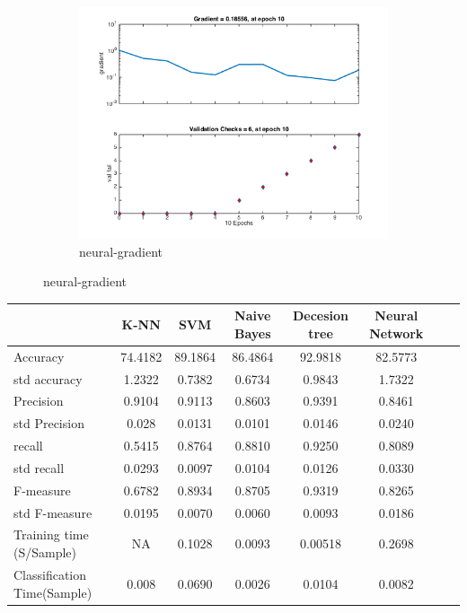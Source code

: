 \documentclass[]{article}
\begin{document}
\begin{figure}[p]
	\begin{subfigure}{.5\textwidth}
		\centering
		\includegraphics[width=1\linewidth]{../images-update/1-(4)-neural_gradient.png}
		\caption{neural-gradient}
		\label{fig:sub1}
	\end{subfigure}
	
\end{figure}
\begin{tabular}
	{l*{6}{c}r}   	& K-NN  & SVM & Naive Bayes & Decesion tree & Neural Network \\ \hline
	Accuracy & 74.4182 & 89.1864 & 86.4864 & 92.9818 & 82.5773 \\ 
	std accuracy & 1.2322 & 0.7382 & 0.6734 & 0.9843 & 1.7322 \\
	Precision & 0.9104 & 0.9113 & 0.8603 &0.9391 & 0.8461\\
	std Precision & 0.028 & 0.0131 & 0.0101 & 0.0146 & 0.0240\\
	recall & 0.5415 & 0.8764 & 0.8810 & 0.9250 & 0.8089\\
	std recall & 0.0293 & 0.0097 & 0.0104 & 0.0126 & 0.0330\\
	F-measure & 0.6782 & 0.8934 & 0.8705 & 0.9319 & 0.8265 \\
	std F-measure & 0.0195 & 0.0070 & 0.0060 & 0.0093 & 0.0186 \\
	Training time (S/Sample) & NA & 0.1028 & 0.0093 & 0.00518 & 0.2698 \\
	Classification Time(Sample) & 0.008 & 0.0690 & 0.0026 & 0.0104 & 0.0082 \\
\end{tabular}
\end{document}
